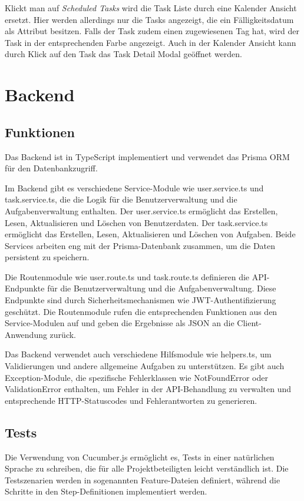 \documentclass[a4paper, 12pt]{article}
\begin{document}
    Klickt man auf {\it Scheduled Tasks} wird die Task Liste durch eine Kalender Ansicht ersetzt. Hier werden allerdings
    nur die Tasks angezeigt, die ein Fälligkeitsdatum als Attribut besitzen. Falls der Task zudem einen zugewiesenen Tag
    hat, wird der Task in der entsprechenden Farbe angezeigt. Auch in der Kalender Ansicht kann durch Klick auf den Task
    das Task Detail Modal geöffnet werden.


    \section{Backend}
    \subsection{Funktionen}

    Das Backend ist in TypeScript implementiert und verwendet das Prisma ORM für den Datenbankzugriff.

    Im Backend gibt es verschiedene Service-Module wie user.service.ts und task.service.ts, die die Logik für die
    Benutzerverwaltung und die Aufgabenverwaltung enthalten. Der user.service.ts ermöglicht das Erstellen, Lesen,
    Aktualisieren und Löschen von Benutzerdaten. Der task.service.ts ermöglicht das Erstellen, Lesen, Aktualisieren und
    Löschen von Aufgaben. Beide Services arbeiten eng mit der Prisma-Datenbank zusammen, um die Daten persistent zu
    speichern.

    Die Routenmodule wie user.route.ts und task.route.ts definieren die API-Endpunkte für die Benutzerverwaltung und die
    Aufgabenverwaltung. Diese Endpunkte sind durch Sicherheitsmechanismen wie JWT-Authentifizierung geschützt. Die
    Routenmodule rufen die entsprechenden Funktionen aus den Service-Modulen auf und geben die Ergebnisse als JSON an die
    Client-Anwendung zurück.

    Das Backend verwendet auch verschiedene Hilfsmodule wie helpers.ts, um Validierungen und andere allgemeine Aufgaben zu
    unterstützen. Es gibt auch Exception-Module, die spezifische Fehlerklassen wie NotFoundError oder ValidationError
    enthalten, um Fehler in der API-Behandlung zu verwalten und entsprechende HTTP-Statuscodes und Fehlerantworten zu
    generieren.

    \subsection{Tests}

    Die Verwendung von Cucumber.js ermöglicht es, Tests in einer natürlichen Sprache zu schreiben, die für alle Projektbeteiligten leicht
    verständlich ist. Die Testszenarien werden in sogenannten Feature-Dateien definiert, während die Schritte in den Step-Definitionen
    implementiert werden.
\end{document}
